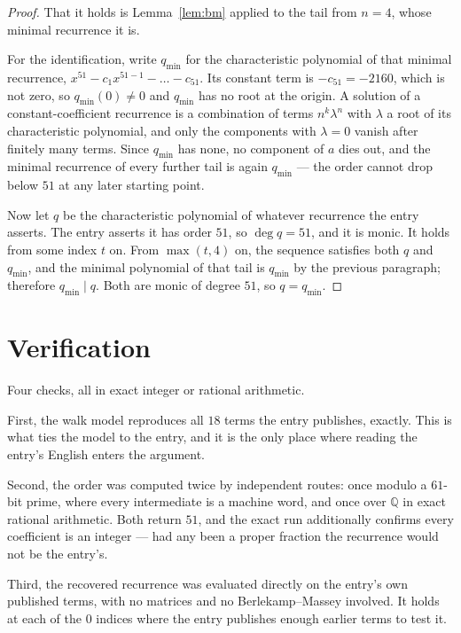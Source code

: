 \documentclass[11pt,a4paper]{article}
\theoremstyle{plain}
\theoremstyle{definition}
\begin{document}
\begin{proof}
That it holds is Lemma~\ref{lem:bm} applied to the tail from $n=4$, whose minimal
recurrence it is.

For the identification, write $q_{\min}$ for the characteristic polynomial of that minimal
recurrence, $x^{51}-c_1x^{51-1}-\dots-c_{51}$. Its constant term is
$-c_{51}=-2160$, which is not zero, so $q_{\min}(0)\neq0$ and $q_{\min}$ has no
root at the origin. A solution of a constant-coefficient recurrence is a combination of terms
$n^{k}\lambda^{n}$ with $\lambda$ a root of its characteristic polynomial, and only the
components with $\lambda=0$ vanish after finitely many terms. Since $q_{\min}$ has none, no
component of $a$ dies out, and the minimal recurrence of every further tail is again
$q_{\min}$ --- the order cannot drop below $51$ at any later starting point.

Now let $q$ be the characteristic polynomial of whatever recurrence the entry asserts. The
entry asserts it has order $51$, so $\deg q=51$, and it is monic. It holds from some
index $t$ on. From $\max(t,4)$ on, the sequence satisfies both $q$ and $q_{\min}$, and
the minimal polynomial of that tail is $q_{\min}$ by the previous paragraph; therefore
$q_{\min}\mid q$. Both are monic of degree $51$, so $q=q_{\min}$.
\end{proof}

\section{Verification}

Four checks, all in exact integer or rational arithmetic.

First, the walk model reproduces all $18$ terms the entry publishes, exactly. This is
what ties the model to the entry, and it is the only place where reading the entry's English
enters the argument.

Second, the order was computed twice by independent routes: once modulo a $61$-bit prime, where
every intermediate is a machine word, and once over $\mathbb{Q}$ in exact rational arithmetic.
Both return $51$, and the exact run additionally confirms every coefficient is an integer
--- had any been a proper fraction the recurrence would not be the entry's.

Third, the recovered recurrence was evaluated directly on the entry's own published terms, with
no matrices and no Berlekamp--Massey involved. It holds at each of the $0$ indices where
the entry publishes enough earlier terms to test it.
\end{document}
